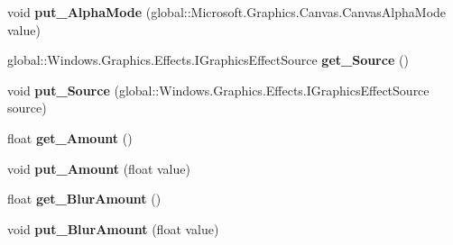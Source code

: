 \begin{DoxyCompactItemize}
void {\bfseries put\+\_\+\+Alpha\+Mode} (global\+::\+Microsoft.\+Graphics.\+Canvas.\+Canvas\+Alpha\+Mode value)
\item 
\mbox{\label{interface_microsoft_1_1_graphics_1_1_canvas_1_1_effects_1_1_i_edge_detection_effect_ae9990d79f4ea9a1bfe5d4eff9af1bb83}} 
global\+::\+Windows.\+Graphics.\+Effects.\+I\+Graphics\+Effect\+Source {\bfseries get\+\_\+\+Source} ()
\item 
\mbox{\label{interface_microsoft_1_1_graphics_1_1_canvas_1_1_effects_1_1_i_edge_detection_effect_ad421800073d091d86a8396aaca06ed81}} 
void {\bfseries put\+\_\+\+Source} (global\+::\+Windows.\+Graphics.\+Effects.\+I\+Graphics\+Effect\+Source source)
\item 
\mbox{\label{interface_microsoft_1_1_graphics_1_1_canvas_1_1_effects_1_1_i_edge_detection_effect_a4e9c33fd362cec60d6638ddd1aeadaab}} 
float {\bfseries get\+\_\+\+Amount} ()
\item 
\mbox{\label{interface_microsoft_1_1_graphics_1_1_canvas_1_1_effects_1_1_i_edge_detection_effect_a25aa355d10926221fb18d7b5ab5d121b}} 
void {\bfseries put\+\_\+\+Amount} (float value)
\item 
\mbox{\label{interface_microsoft_1_1_graphics_1_1_canvas_1_1_effects_1_1_i_edge_detection_effect_a34600b9441ec9b1822069023c004b06d}} 
float {\bfseries get\+\_\+\+Blur\+Amount} ()
\item 
\mbox{\label{interface_microsoft_1_1_graphics_1_1_canvas_1_1_effects_1_1_i_edge_detection_effect_ae34ee491a4a76a40ac93a1257d408521}} 
void {\bfseries put\+\_\+\+Blur\+Amount} (float value)
\item 
\mbox{\label{interface_microsoft_1_1_graphics_1_1_canvas_1_1_effects_1_1_i_edge_detection_effect_af4eed9893a7039265777bc63d06a5dad}} 

\end{DoxyCompactItemize}
